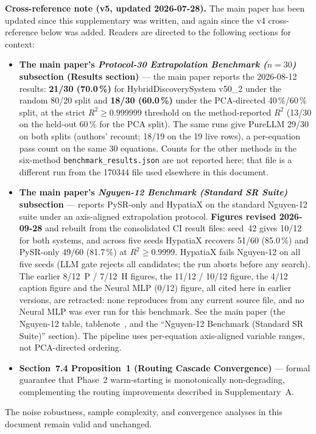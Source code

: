 \documentclass[twoside,11pt]{article}
\newcommand{\Rsq}{R^{2}}
\begin{document}
\medskip
\noindent\textbf{Cross-reference note (v5, updated 2026-07-28).}
The main paper has been updated since this supplementary was written, and
again since the v4 cross-reference below was added. Readers are directed
to the following sections for context:
\begin{itemize}
  \item \textbf{The main paper's \emph{Protocol-30 Extrapolation Benchmark ($n=30$)} subsection (Results section)} --- the main paper
    reports the 2026-08-12 results: \textbf{21/30 (70.0\,\%)} for
    HybridDiscoverySystem v50\_2 under the random 80/20 split and
    \textbf{18/30 (60.0\,\%)} under the PCA-directed 40\,\%/60\,\% split, at
    the strict $\Rsq \geq 0.999999$ threshold on the method-reported $\Rsq$ (13/30 on the
    held-out 60\,\% for the PCA split). The same
    runs give PureLLM 29/30 on both splits (authors' recount; 18/19 on the 19 live rows),
    a per-equation pass count on the same 30 equations. Counts for the other methods
    in the six-method \texttt{benchmark\_results.json} are not reported here; that
    file is a different run from the 170344 file used elsewhere in this document.
  \item \textbf{The main paper's \emph{Nguyen-12 Benchmark (Standard SR Suite)} subsection} --- reports
    PySR-only and HypatiaX on the standard Nguyen-12 suite under an axis-aligned
    extrapolation protocol. \textbf{Figures revised 2026-09-28} and rebuilt from
    the consolidated CI result files: seed~42 gives 10/12 for both systems, and
    across five seeds HypatiaX recovers 51/60 (85.0\,\%) and PySR-only 49/60
    (81.7\,\%) at $\Rsq\ge0.9999$. HypatiaX fails Nguyen-12 on all five seeds
    (LLM gate rejects all candidates; the run aborts before any search).
    The earlier 8/12~P / 7/12~H figures, the 11/12 / 10/12 figure, the
    4/12 caption figure and the Neural MLP (0/12) figure, all cited here in
    earlier versions, are retracted: none reproduces from any current source
    file, and no Neural MLP was ever run for this benchmark. See the main paper
    (the Nguyen-12 table, tablenote~\ddag, and the ``Nguyen-12 Benchmark (Standard SR Suite)'' section). The
    pipeline uses per-equation axis-aligned variable ranges, not PCA-directed
    ordering.
  \item \textbf{Section~7.4 Proposition~1 (Routing Cascade Convergence)} --- formal
    guarantee that Phase~2 warm-starting is monotonically non-degrading,
    complementing the routing improvements described in Supplementary~A.
\end{itemize}
The noise robustness, sample complexity, and convergence analyses in this
document remain valid and unchanged.
\end{document}
